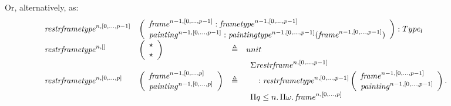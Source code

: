 \documentclass{article}
\newcommand{\defeq}{\triangleq}
\newcommand{\myframe}{\mathit{frame}}
\newcommand{\myframetype}{\mathit{frametype}}
\newcommand{\painting}{\mathit{painting}}
\newcommand{\paintingtype}{\mathit{paintingtype}}
\newcommand{\restrframe}{\mathit{restrframe}}
\newcommand{\restrframetype}{\mathit{restrframetype}}
\begin{document}
\begin{itemize}
        Or, alternatively, as:
        $$\!\!\!\!\!\!\!\!\!\!\!\!
          \begin{array}{llcl}
            \restrframetype^{n,[0,...,p-1]}                            &
            \multicolumn{3}{l}{
              \left(\begin{array}{l}
                        \myframe^{n-1,[0,...,p-1]}:\myframetype^{n-1,[0,...,p-1]}                               \\
                        \painting^{n-1,[0,...,p-1]}:\paintingtype^{n-1,[0,...,p-1]}(\myframe^{n-1,[0,...,p-1]}) \\
                      \end{array}\right) : Type_{l}
            }                                                                                         \\
            \restrframetype^{n,[]}                                     &
            \left(\begin{array}{l}
                      \star \\
                      \star \\
                    \end{array}\right)                                     & \defeq &
            unit                                                                                      \\
            \restrframetype^{n,[0,...,p]}                              &
            \left(\begin{array}{l}
                      \myframe^{n-1,[0,...,p]}  \\
                      \painting^{n-1,[0,...,p]} \\
                    \end{array}\right) & \defeq &
            \begin{array}{l}
              \Sigma \restrframe^{n,[0,...,p-1]}                            \\
              \quad:\restrframetype^{n,[0,...,p-1]}
              \left(\begin{array}{l}
                        \myframe^{n-1,[0,...,p-1]}  \\
                        \painting^{n-1,[0,...,p-1]} \\
                      \end{array}\right)
              .\,                                                           \\
              \Pi q\leq n.\,\Pi \omega.\,\myframe^{n,[0,...,p]}

\end{array}
\end{array}$$
\end{itemize}
\end{document}
